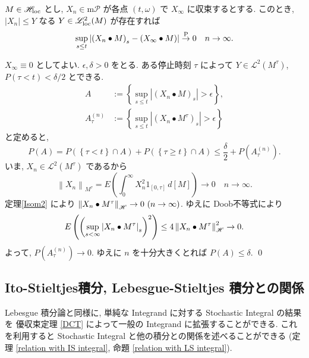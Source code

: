 \documentclass{ltjsarticle}
\begin{document}
\begin{thm}	\label{DCT}
	\( M \in \mathscr{H}_{\mathrm{loc}} \) とし, \( X_n \in \mathrm{m}\mathscr{P} \) が各点 \( ( t,\omega) \) で \( X_{\infty} \)
	に収束するとする.
	このとき, \( \left| X_n \right| \le Y \) なる \( Y \in \mathscr{L}^2_{\mathrm{loc}}(M) \) が存在すれば
	\[
		\sup_{ s \le t }	\left|
		\left( X_n \bullet M \right)_s 
		- \left( X_{\infty} \bullet M \right)
		\right|
		\stackrel{ \mathrm{P} }{ \to } 0	\quad n \to \infty.
	\]
\end{thm}
\begin{prf}
	\( X_{\infty} \equiv 0 \) としてよい.
	\( \epsilon, \delta > 0 \) をとる.
	ある停止時刻 \( \tau \) によって
	\( Y \in \mathscr{L}^2( M^{\tau} ) \),
	\( P \left( \tau < t \right) < \delta / 2 \)
	とできる.
	\begin{align*}
		A              & :=	
		\left\{ 
		\sup_{ s \le t } \left| \left( X_n \bullet M \right)_s \right| > \epsilon 
		\right\},
		\\
		A_{\tau}^{(n)} & :=	
		\left\{ 
		\sup_{ s \le t } \left| \left( X_n \bullet M^{\tau} \right)_s \right| > \epsilon 
		\right\}
	\end{align*}
	と定めると,
	\[
		P\left( A \right)	=	P\left( \left\{ \tau <t \right\} \cap A \right)
		+ P\left( \left\{ \tau \ge t \right\} \cap A \right)
		\le
		\frac{ \delta }{ 2 } + P\left( A_{\tau}^{(n)} \right).
	\]
	いま, \( X_n \in \mathscr{L}^2( M^{\tau} ) \) であるから
	\[
		\left\| X_n \right\|_{ M^{\tau} }
		=	E \left( \int_0^{\infty} X_n^2 1_{ [ 0,\tau ] }\, d[M] \right)
		\to 0 \quad n \to \infty.
	\]
	定理\ref{Isom2} により
	\( \left\|  X_n \bullet M^{\tau}  \right\|_{\mathscr{H}} \to 0 \ ( n \to \infty) \).
	ゆえに
	Doob不等式により
	\[
		E \left( \left( \sup_{ s < \infty} \left| X_n \bullet M^{\tau} \right|_s \right)^2 \right)
		\le
		4 \left\|  X_n \bullet M^{\tau}  \right\|_{\mathscr{H}}^2 \to 0.
	\]
	よって,
	\( P\left( A_{\tau}^{(n)} \right) \to 0 \).
	ゆえに \( n \) を十分大きくとれば \( P\left( A \right) \le \delta \).
	\qed\end{prf}

\subsection{Ito-Stieltjes積分, Lebesgue-Stieltjes 積分との関係}
Lebesgue 積分論と同様に, 単純な Integrand に対する Stochastic Integral の結果を
優収束定理 \ref{DCT} によって一般の Integrand に拡張することができる. これを利用すると Stochastic Integral と他の積分との関係を述べることができる (定理 \ref{relation with IS integral}, 命題 \ref{relation with LS integral}). 
\end{document}
